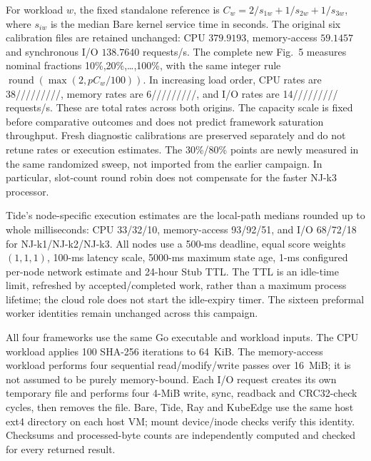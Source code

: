 For workload $w$, the fixed standalone reference is $C_w=2/s_{1w}+1/s_{2w}+1/s_{3w}$, where $s_{iw}$ is the median Bare kernel service time in seconds. The original six calibration files are retained unchanged: CPU $379.9193$, memory-access $59.1457$ and synchronous I/O $138.7640$ requests/s. The complete new Fig.~5 measures nominal fractions 10\%,20\%,\ldots,100\%, with the same integer rule $\operatorname{round}(\max(2,pC_w/100))$. In increasing load order, CPU rates are 38/////////, memory rates are 6/////////, and I/O rates are 14///////// requests/s. These are total rates across both origins. The capacity scale is fixed before comparative outcomes and does not predict framework saturation throughput. Fresh diagnostic calibrations are preserved separately and do not retune rates or execution estimates. The 30\%/80\% points are newly measured in the same randomized sweep, not imported from the earlier campaign. In particular, slot-count round robin does not compensate for the faster NJ-k3 processor.

Tide's node-specific execution estimates are the local-path medians rounded up to whole milliseconds: CPU 33/32/10, memory-access 93/92/51, and I/O 68/72/18 for NJ-k1/NJ-k2/NJ-k3. All nodes use a 500-ms deadline, equal score weights $(1,1,1)$, 100-ms latency scale, 5000-ms maximum state age, 1-ms configured per-node network estimate and 24-hour Stub TTL. The TTL is an idle-time limit, refreshed by accepted/completed work, rather than a maximum process lifetime; the cloud role does not start the idle-expiry timer. The sixteen preformal worker identities remain unchanged across this campaign.

All four frameworks use the same Go executable and workload inputs. The CPU workload applies 100 SHA-256 iterations to 64~KiB. The memory-access workload performs four sequential read/modify/write passes over 16~MiB; it is not assumed to be purely memory-bound. Each I/O request creates its own temporary file and performs four 4-MiB write, sync, readback and CRC32-check cycles, then removes the file. Bare, Tide, Ray and KubeEdge use the same host ext4 directory on each host VM; mount device/inode checks verify this identity. Checksums and processed-byte counts are independently computed and checked for every returned result.

